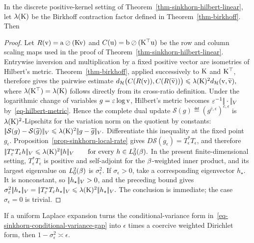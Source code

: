 \begin{prop}\label{prop-sinkhorn-hilbert-controls-local}
In the discrete positive-kernel setting of Theorem~\ref{thm-sinkhorn-hilbert-linear}, let $\lambda(\mathrm{K})$ be the Birkhoff contraction factor defined in Theorem~\ref{thm-birkhoff}. Then
\end{prop}
\begin{proof}
Let $R(\mathrm{v})=\mathrm{a}\oslash(\mathrm{K}\mathrm{v})$ and $C(\mathrm{u})=\mathrm{b}\oslash(\mathrm{K}^\top\mathrm{u})$ be the row and column scaling maps used in the proof of Theorem~\ref{thm-sinkhorn-hilbert-linear}. Entrywise inversion and multiplication by a fixed positive vector are isometries of Hilbert's metric. Theorem~\ref{thm-birkhoff}, applied successively to $\mathrm{K}$ and $\mathrm{K}^\top$, therefore gives the pairwise estimate
\(d_{\mathcal{H}}\bigl(C(R(\mathrm{v})),C(R(\widetilde{\mathrm{v}}))\bigr) \leqslant \lambda(\mathrm{K})^2d_{\mathcal{H}}(\mathrm{v},\widetilde{\mathrm{v}}),\)
where $\lambda(\mathrm{K}^\top)=\lambda(\mathrm{K})$ follows directly from its cross-ratio definition. Under the logarithmic change of variables $g=\varepsilon\log\mathrm{v}$, Hilbert's metric becomes $\varepsilon^{-1}|\!| \cdot |\!|_V$ by~\eqref{eq-hilbert-metric}. Hence the complete dual update
\(
\mathcal S(g)\eqdef(g^{\bar c,\epsilon})^{c,\epsilon}
\)
is $\lambda(\mathrm{K})^2$-Lipschitz for the variation norm on the quotient by constants: \(|\!| \mathcal S(g)-\mathcal S(\widetilde g) |\!|_V \leqslant \lambda(\mathrm{K})^2|\!| g-\widetilde g |\!|_V.\)
Differentiate this inequality at the fixed point $g_\epsilon$. Proposition~\ref{prop-sinkhorn-local-rate} gives
\(D\mathcal S(g_\epsilon)=T_\epsilon^*T_\epsilon\), and therefore
\(|\!| T_\varepsilon^*T_\varepsilon h |\!|_V \leqslant \lambda(\mathrm{K})^2|\!| h |\!|_V \qquad \text{for every }h\in L_0^2(\beta).\)
In the present finite-dimensional setting, $T_\epsilon^*T_\epsilon$ is positive and self-adjoint for the $\beta$-weighted inner product, and its largest eigenvalue on $L_0^2(\beta)$ is $\sigma_\epsilon^2$. If $\sigma_\epsilon>0$, take a corresponding eigenvector $h_\star$. It is nonconstant, so $|\!| h_\star |\!|_V>0$, and the preceding bound gives
\(\sigma_\varepsilon^2|\!| h_\star |\!|_V = |\!| T_\varepsilon^*T_\varepsilon h_\star |\!|_V \leqslant \lambda(\mathrm{K})^2|\!| h_\star |\!|_V.\)
The conclusion is immediate; the case $\sigma_\epsilon=0$ is trivial.
\end{proof}
If a uniform Laplace expansion turns the conditional-variance form in~\eqref{eq-sinkhorn-conditional-variance-gap} into $\epsilon$ times a coercive weighted Dirichlet form, then
\(
1-\sigma_\epsilon^2\asymp\epsilon.
\)
